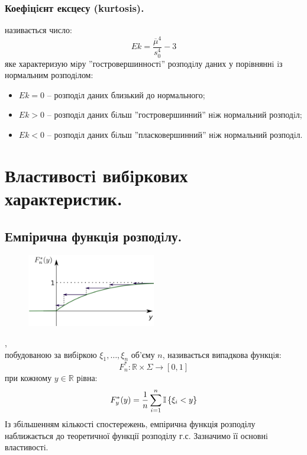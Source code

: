 \subsubsection{Коефiцiєнт ексцесу (kurtosis).}
 називається число:
$$
Ek = \frac{\overline{\mu}^4}{s_0^4} - 3
$$
яке характеризую мiру ''гостровершинностi'' розподiлу даних у порiвняннi iз нормальним
розподiлом:
\begin{itemize}
\item $Ek = 0$ – розподiл даних близький до нормального;
\item $Ek > 0$ – розподiл даних бiльш ”гостровершинний” нiж нормальний розподiл;
\item $Ek < 0$ – розподiл даних бiльш ”пласковершинний” нiж нормальний розподiл.
\end{itemize}
\section{Властивостi вибiркових характеристик.}
\subsection{Емпiрична функцiя розподiлу.}
\begin{figure}
\vspace*{-2em}
\centering
\includegraphics[width=0.5\textwidth]{assets/lectures_part_5-c8ce8645.png}
\end{figure}
, \\ побудованою за вибiркою $\xi_1, \dots , \xi_n$ об’єму $n$, називається випадкова
функцiя: \\$$F_n^* : \mathbb{R} \times \Sigma \to [0,1]$$ при кожному $y \in \mathbb{R}$ рiвна:
$$
F_y^* (y) = \frac{1}{n}  \sum\limits_{i = 1}^{ n}{ \mathbb{I} \left\lbrace \xi_i < y \right\rbrace}
$$
Із збільшенням кількості спостережень, емпірична функція розподілу наближається до теоретичної функції розподілу г.с. Зазначимо її основнi властивостi.

